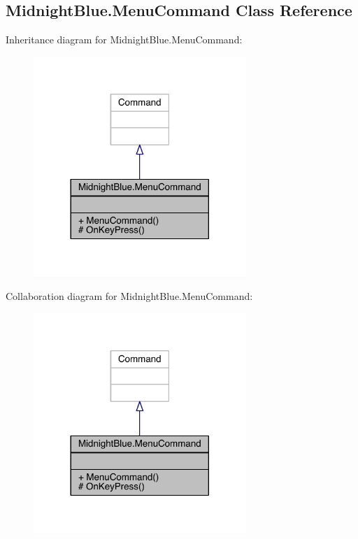 \hypertarget{class_midnight_blue_1_1_menu_command}{}\subsection{Midnight\+Blue.\+Menu\+Command Class Reference}
\label{class_midnight_blue_1_1_menu_command}


Inheritance diagram for Midnight\+Blue.\+Menu\+Command\+:\nopagebreak
\begin{figure}[H]
\begin{center}
\leavevmode
\includegraphics[width=228pt]{class_midnight_blue_1_1_menu_command__inherit__graph}
\end{center}
\end{figure}


Collaboration diagram for Midnight\+Blue.\+Menu\+Command\+:\nopagebreak
\begin{figure}[H]
\begin{center}
\leavevmode
\includegraphics[width=228pt]{class_midnight_blue_1_1_menu_command__coll__graph}
\end{center}
\end{figure}
